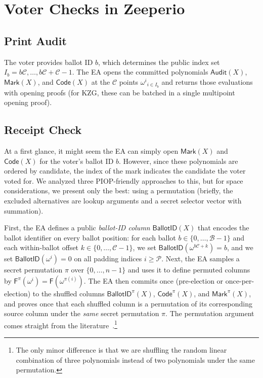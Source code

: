 

\section{Voter Checks in Zeeperio}
\label{app:vv}

\subsection{Print Audit}
\label{sec:print}

The voter provides ballot ID $b$, which determines the public index set $I_b={b\mathcal{C},\ldots,b\mathcal{C}+\mathcal{C}-1}$. The EA opens the committed polynomials $\mathsf{Audit}(X)$, $\mathsf{Mark}(X)$, and $\mathsf{Code}(X)$ at the $\mathcal{C}$ points ${\omega^i}_{i\in I_b}$ and returns those evaluations with opening proofs (for KZG, these can be batched in a single multipoint opening proof). 

\subsection{Receipt Check}
\label{sec:receipt}

At a first glance, it might seem the EA can simply open $\mathsf{Mark}(X)$ and $\mathsf{Code}(X)$ for the voter's ballot ID $b$. However, since these polynomials are ordered by candidate, the index of the mark indicates the candidate the voter voted for. We analyzed three PIOP-friendly approaches to this, but for space considerations, we present only the best: using a permutation (briefly, the excluded alternatives are lookup arguments and a secret selector vector with summation). 

First, the EA defines a public \emph{ballot-ID column} $\mathsf{BallotID}(X)$ that encodes the ballot identifier on every ballot position: for each ballot $b\in\{0,\dots,\mathcal{B}-1\}$ and each within-ballot offset $k\in\{0,\dots,\mathcal{C}-1\}$, we set $\mathsf{BallotID}(\omega^{b\mathcal{C}+k})=b$, and we set $\mathsf{BallotID}(\omega^i)=0$ on all padding indices $i\ge \mathcal{P}$. Next, the EA samples a secret permutation $\pi$ over $\{0,\dots,n-1\}$ and uses it to define permuted columns by $\mathsf{F}^{\pi}(\omega^i)=\mathsf{F}(\omega^{\pi(i)})$. The EA then commits once (pre-election or once-per-election) to the shuffled columns $\mathsf{BallotID}^{\pi}(X)$, $\mathsf{Code}^{\pi}(X)$, and $\mathsf{Mark}^{\pi}(X)$, and proves once that each shuffled column is a permutation of its corresponding source column under the \emph{same} secret permutation $\pi$. The permutation argument comes straight from the literature~\cite{GWC19}.\footnote{The only minor difference is that we are shuffling the random linear combination of three polynomials instead of two polynomials under the same permutation.}

